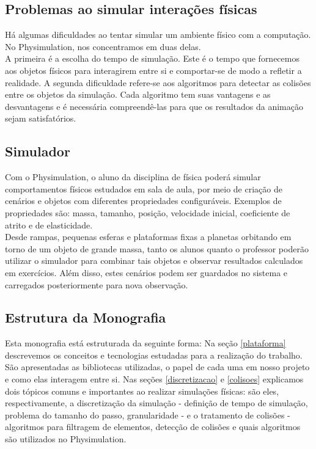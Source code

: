 \subsection{Problemas ao simular interações físicas}
Há algumas dificuldades ao tentar simular um ambiente físico com a computação. No Physimulation, nos concentramos em duas delas.\\

A primeira é a escolha do tempo de simulação. Este é o tempo que fornecemos aos objetos físicos para interagirem entre si e comportar-se de modo a refletir a realidade. A segunda dificuldade refere-se aos algoritmos para detectar as colisões entre os objetos da simulação. Cada algoritmo tem suas vantagens e as desvantagens e é necessária compreendê-las para que os resultados da animação sejam satisfatórios.

\subsection{Simulador}
Com o Physimulation, o aluno da disciplina de física poderá simular comportamentos físicos estudados em sala de aula, por meio de criação de cenários e objetos com diferentes propriedades configuráveis. Exemplos de propriedades são: massa, tamanho, posição, velocidade inicial, coeficiente de atrito e de elasticidade. \\

Desde rampas, pequenas esferas e plataformas fixas a planetas orbitando em torno de um objeto de grande massa, tanto os alunos quanto o professor poderão utilizar o simulador para combinar tais objetos e observar resultados calculados em exercícios. Além disso, estes cenários podem ser guardados no sistema e carregados posteriormente para nova observação.

\subsection{Estrutura da Monografia}
Esta monografia está estruturada da seguinte forma: Na seção \ref{plataforma} descrevemos os conceitos e tecnologias estudadas para a realização do trabalho. São apresentadas as bibliotecas utilizadas, o papel de cada uma em nosso projeto e como elas interagem entre si. Nas seções \ref{discretizacao} e \ref{colisoes} explicamos dois tópicos comuns e importantes ao realizar simulações físicas: são eles, respectivamente, a discretização da simulação - definição de tempo de simulação, problema do tamanho do passo, granularidade - e o tratamento de colisões - algoritmos para filtragem de elementos, detecção de colisões e quais algoritmos são utilizados no Physimulation.  \\

